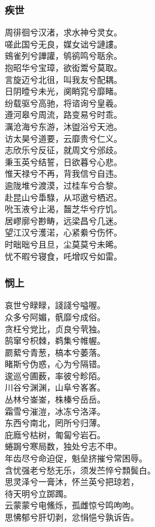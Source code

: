 \documentclass[]{article}
\begin{document}
\hypertarget{header-n3141}{%
\subsubsection{疾世}\label{header-n3141}}

周徘徊兮汉渚，求水神兮灵女。\\
嗟此国兮无良，媒女诎兮謰謱。\\
鴳雀列兮譁讙，鸲鹆鸣兮聒余。\\
抱昭华兮宝璋，欲衒鬻兮莫取。\\
言旋迈兮北徂，叫我友兮配耦。\\
日阴曀兮未光，阒睄窕兮靡睹。\\
纷载驱兮高驰，将谘询兮皇羲。\\
遵河皋兮周流，路变易兮时乖。\\
濿沧海兮东游，沐盥浴兮天池。\\
访太昊兮道要，云靡贵兮仁义。\\
志欣乐兮反征，就周文兮邠歧。\\
秉玉英兮结誓，日欲暮兮心悲。\\
惟天禄兮不再，背我信兮自违。\\
逾陇堆兮渡漠，过桂车兮合黎。\\
赴昆山兮馽騄，从邛遨兮栖迟。\\
吮玉液兮止渴，齧芝华兮疗饥。\\
居嵺廓兮尠畴，远梁昌兮几迷。\\
望江汉兮濩渃，心紧絭兮伤怀。\\
时昢昢兮且旦，尘莫莫兮未晞。\\
忧不暇兮寝食，吒增叹兮如雷。

\hypertarget{header-n3146}{%
\subsubsection{悯上}\label{header-n3146}}

哀世兮睩睩，諓諓兮嗌喔。\\
众多兮阿媚，骪靡兮成俗。\\
贪枉兮党比，贞良兮茕独。\\
鹄窜兮枳棘，鹈集兮帷幄。\\
罽蕠兮青葱，槁本兮萎落。\\
睹斯兮伪惑，心为兮隔错。\\
逡巡兮圃薮，率彼兮畛陌。\\
川谷兮渊渊，山阜兮峉峉。\\
丛林兮崟崟，株榛兮岳岳。\\
霜雪兮漼溰，冰冻兮洛泽。\\
东西兮南北，罔所兮归薄。\\
庇廕兮枯树，匍匐兮岩石。\\
蜷跼兮寒局数，独处兮志不申。\\
年齿尽兮命迫促，魁垒挤摧兮常困辱。\\
含忧强老兮愁无乐，须发苎悴兮顠鬓白。\\
思灵泽兮一膏沐，怀兰英兮把琼若，\\
待天明兮立踯躅。\\
云蒙蒙兮电鯈烁，孤雌惊兮鸣呴呴。\\
思怫郁兮肝切剥，忿悁悒兮孰诉告。
\end{document}
